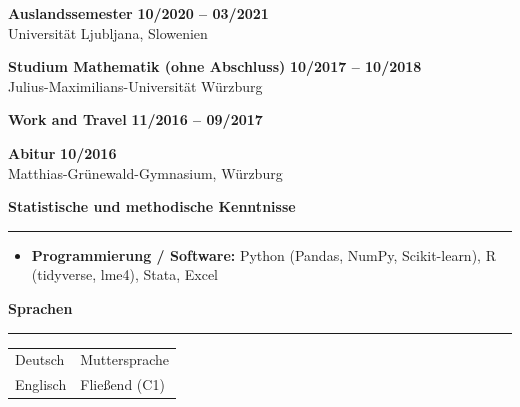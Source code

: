 \documentclass[11pt,a4paper]{article}
\newcommand{\sectiontitle}[1]{
    {\large \textbf{#1}} \vspace{0.2cm} \hrule \vspace{0.5cm}
}
\begin{document}
\textbf{Auslandssemester} \hfill \textbf{10/2020 – 03/2021} \\
Universität Ljubljana, Slowenien
\vspace{0.3cm}

\textbf{Studium Mathematik (ohne Abschluss)} \hfill \textbf{10/2017 – 10/2018} \\
Julius-Maximilians-Universität Würzburg
\vspace{0.3cm}

\textbf{Work and Travel} \hfill \textbf{11/2016 – 09/2017}
\vspace{0.3cm}

\textbf{Abitur} \hfill \textbf{10/2016} \\
Matthias-Grünewald-Gymnasium, Würzburg

\vspace{0.5cm}

\sectiontitle{Statistische und methodische Kenntnisse}

\begin{itemize}[leftmargin=*, noitemsep, topsep=0pt]
\item \textbf{Programmierung / Software:} Python (Pandas, NumPy, Scikit-learn), R (tidyverse, lme4), Stata, Excel
\end{itemize}

\vspace{0.5cm}

\sectiontitle{Sprachen}

\begin{tabular}{@{}ll}
Deutsch & Muttersprache \\
Englisch & Fließend (C1)
\end{tabular}
\end{document}
